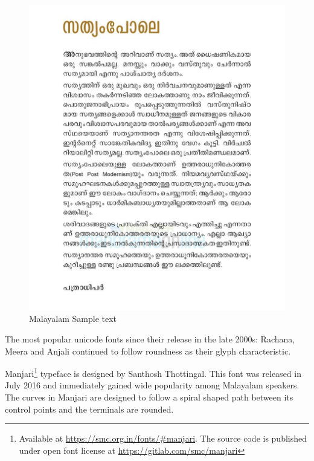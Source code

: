 \documentclass[11pt,twoside,a4paper]{article}
\begin{document}
\begin{figure}
	\includegraphics[width=\textwidth]{images/malayalam-sample.png}
	\caption{Malayalam Sample text}
	\label{malsample}
\end{figure}

 
The most popular unicode fonts since their release in the late 2000s: Rachana, Meera and Anjali continued to follow roundness as their glyph characteristic. 

Manjari\footnote{Available at \url{https://smc.org.in/fonts/\#manjari}. The source code is published under open font license at \url{https://gitlab.com/smc/manjari}} typeface is designed by Santhosh Thottingal. This font was released in July 2016 and immediately gained wide popularity among Malayalam speakers. The curves in Manjari are designed to follow a spiral shaped path between its control points and the terminals are rounded. %

 
\end{document}
